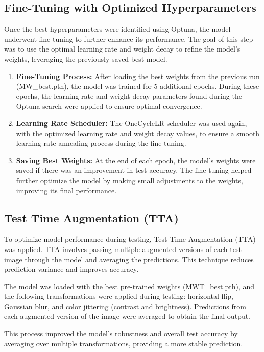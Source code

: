 \documentclass[twoside, 11pt]{article}
\begin{document}
\subsection{Fine-Tuning with Optimized Hyperparameters}
Once the best hyperparameters were identified using Optuna, the model underwent fine-tuning to further enhance its performance. The goal of this step was to use the optimal learning rate and weight decay to refine the model's weights, leveraging the previously saved best model.
\begin{enumerate}
    \item \textbf{Fine-Tuning Process:} After loading the best weights from the previous run (MW\_best.pth), the model was trained for 5 additional epochs. During these epochs, the learning rate and weight decay parameters found during the Optuna search were applied to ensure optimal convergence.
    \item \textbf{Learning Rate Scheduler:} The OneCycleLR scheduler was used again, with the optimized learning rate and weight decay values, to ensure a smooth learning rate annealing process during the fine-tuning.
    \item \textbf{Saving Best Weights:} At the end of each epoch, the model’s weights were saved if there was an improvement in test accuracy. The fine-tuning helped further optimize the model by making small adjustments to the weights, improving its final performance.
\end{enumerate}

\subsection{Test Time Augmentation (TTA)}
To optimize model performance during testing, Test Time Augmentation (TTA) was applied. TTA involves passing multiple augmented versions of each test image through the model and averaging the predictions. This technique reduces prediction variance and improves accuracy.

The model was loaded with the best pre-trained weights (MWT\_best.pth), and the following transformations were applied during testing: horizontal flip, Gaussian blur, and color jittering (contrast and brightness). Predictions from each augmented version of the image were averaged to obtain the final output.

This process improved the model's robustness and overall test accuracy by averaging over multiple transformations, providing a more stable prediction.
\end{document}
